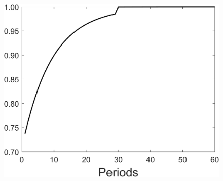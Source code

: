 \begin{figure}[h!!]
\begin{minipage}[]{0.32\textwidth}
\end{minipage}
\begin{minipage}[]{0.32\textwidth}
	\includegraphics[width=1\textwidth]{../../codding_model/Own/figures/Rep_agent/staticRam_LF_separate_tauul_periods59_eppsilon0.40_zeta1.40_Ad08_Ac04_thetac0.70_thetad0.56_HetGrowth1_tauul0.181_util0_withtarget1_lgd0.png}
\end{minipage}
\end{figure}

